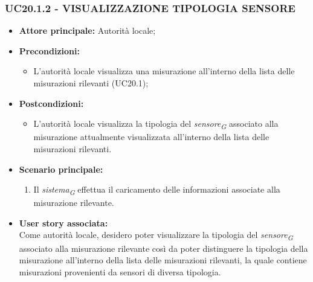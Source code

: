 \subsubsection{UC20.1.2 - VISUALIZZAZIONE TIPOLOGIA SENSORE}
\begin{itemize}
    \item \textbf{Attore principale:} Autorità locale;
    \item \textbf{Precondizioni:}
        \begin{itemize}
                \item L'autorità locale visualizza una misurazione all'interno della lista delle misurazioni rilevanti (UC20.1);
        \end{itemize}
    \item \textbf{Postcondizioni:}
        \begin{itemize}
            \item L'autorità locale visualizza la tipologia del \textit{sensore}\textsubscript{\textit{G}} associato alla misurazione attualmente visualizzata all'interno della lista delle misurazioni rilevanti.
        \end{itemize}
    \item \textbf{Scenario principale:}
        \begin{enumerate}
            \item Il \textit{sistema}\textsubscript{\textit{G}} effettua il caricamento delle informazioni associate alla misurazione rilevante.
        \end{enumerate}
    \item \textbf{User story associata:} \\
    Come autorità locale, desidero poter visualizzare la tipologia del \textit{sensore}\textsubscript{\textit{G}} associato alla misurazione rilevante così da poter distinguere la tipologia della misurazione all'interno della lista delle misurazioni rilevanti, la quale contiene misurazioni provenienti da sensori di diversa tipologia.
\end{itemize}